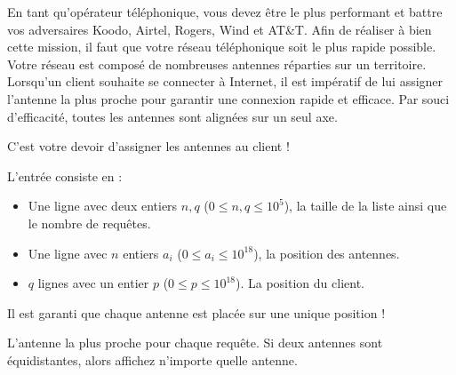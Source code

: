 

En tant qu'opérateur téléphonique, vous devez être le plus performant et battre vos adversaires Koodo, Airtel, Rogers, Wind et AT\&T. Afin de réaliser à bien cette mission, il faut que votre réseau téléphonique soit le plus rapide possible. Votre réseau est composé de nombreuses antennes réparties sur un territoire. Lorsqu'un client souhaite se connecter à Internet, il est impératif de lui assigner l'antenne la plus proche pour garantir une connexion rapide et efficace. Par souci d'efficacité, toutes les antennes sont alignées sur un seul axe.

C'est votre devoir d'assigner les antennes au client !

\begin{Input}
    L'entrée consiste en :
    \begin{itemize}
        \item Une ligne avec deux entiers $n, q$ ($0\leq n, q\leq 10^5$), la taille de la liste ainsi que le nombre de requêtes.
        \item Une ligne avec $n$ entiers $a_i$ ($0  \leq a_i \leq 10^{18}$), la position des antennes.
        \item $q$ lignes avec un entier $p$ ($0 \leq p \leq 10^{18}$). La position du client.
    \end{itemize}
    Il est garanti que chaque antenne est placée sur une unique position !
\end{Input}

\begin{Output}
    L'antenne la plus proche pour chaque requête. Si deux antennes sont équidistantes, alors affichez n'importe quelle antenne.
\end{Output}
